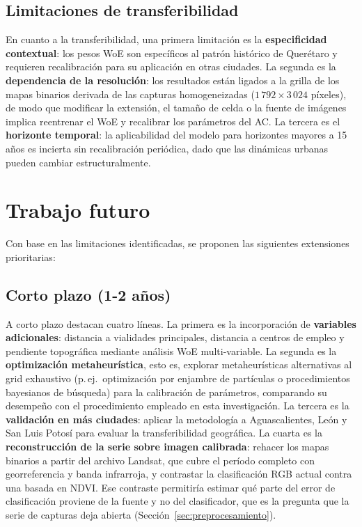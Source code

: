 \subsection{Limitaciones de transferibilidad}

En cuanto a la transferibilidad, una primera limitación es la \textbf{especificidad contextual}: los pesos WoE son específicos al patrón histórico de Querétaro y requieren recalibración para su aplicación en otras ciudades. La segunda es la \textbf{dependencia de la resolución}: los resultados están ligados a la grilla de los mapas binarios derivada de las capturas homogeneizadas ($1\,792 \times 3\,024$ píxeles), de modo que modificar la extensión, el tamaño de celda o la fuente de imágenes implica reentrenar el WoE y recalibrar los parámetros del AC. La tercera es el \textbf{horizonte temporal}: la aplicabilidad del modelo para horizontes mayores a 15 años es incierta sin recalibración periódica, dado que las dinámicas urbanas pueden cambiar estructuralmente.

\section{Trabajo futuro}
\label{sec:trabajo-futuro}

Con base en las limitaciones identificadas, se proponen las siguientes extensiones prioritarias:

\subsection{Corto plazo (1-2 años)}

A corto plazo destacan cuatro líneas. La primera es la incorporación de \textbf{variables adicionales}: distancia a vialidades principales, distancia a centros de empleo y pendiente topográfica mediante análisis WoE multi-variable. La segunda es la \textbf{optimización metaheurística}, esto es, explorar metaheurísticas alternativas al grid exhaustivo (p.\,ej.\ optimización por enjambre de partículas o procedimientos bayesianos de búsqueda) para la calibración de parámetros, comparando su desempeño con el procedimiento empleado en esta investigación. La tercera es la \textbf{validación en más ciudades}: aplicar la metodología a Aguascalientes, León y San Luis Potosí para evaluar la transferibilidad geográfica. La cuarta es la \textbf{reconstrucción de la serie sobre imagen calibrada}: rehacer los mapas binarios a partir del archivo Landsat, que cubre el período completo con georreferencia y banda infrarroja, y contrastar la clasificación RGB actual contra una basada en NDVI. Ese contraste permitiría estimar qué parte del error de clasificación proviene de la fuente y no del clasificador, que es la pregunta que la serie de capturas deja abierta (Sección~\ref{sec:preprocesamiento}).

